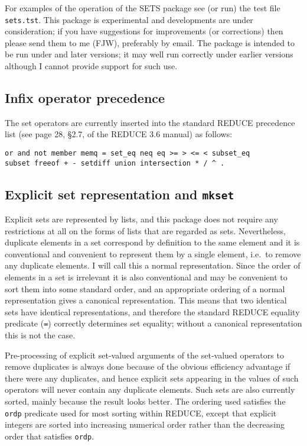 For examples of the operation of the SETS package see (or run) the
test file \texttt{sets.tst}.  This package is experimental and
developments are under consideration; if you have suggestions for
improvements (or corrections) then please send them to me (FJW),
preferably by email.  The package is intended to be run under
 and later versions; it may well run correctly under earlier
versions although I cannot provide support for such use.


\subsection{Infix operator precedence}

The set operators are currently inserted into the standard REDUCE
precedence list (see page 28, \S2.7, of the REDUCE 3.6 manual) as
follows:
\begin{verbatim}
or and not member memq = set_eq neq eq >= > <= < subset_eq
subset freeof + - setdiff union intersection * / ^ .
\end{verbatim}


\subsection{Explicit set representation and \texttt{mkset}}

Explicit sets are represented by lists, and this package does not
require any restrictions at all on the forms of lists that are
regarded as sets.  Nevertheless, duplicate elements in a set
correspond by definition to the same element and it is conventional
and convenient to represent them by a single element, i.e.\ to remove
any duplicate elements.  I will call this a normal representation.
Since the order of elements in a set is irrelevant it is also
conventional and may be convenient to sort them into some standard
order, and an appropriate ordering of a normal representation gives a
canonical representation.  This means that two identical sets have
identical representations, and therefore the standard REDUCE equality
predicate (\texttt{=}) correctly determines set equality; without a
canonical representation this is not the case.

Pre-processing of explicit set-valued arguments of the set-valued
operators to remove duplicates is always done because of the obvious
efficiency advantage if there were any duplicates, and hence explicit
sets appearing in the values of such operators will never contain any
duplicate elements.  Such sets are also currently sorted, mainly
because the result looks better.  The ordering used satisfies the {\tt
ordp} predicate used for most sorting within REDUCE, except that
explicit integers are sorted into increasing numerical order rather
than the decreasing order that satisfies \texttt{ordp}.

